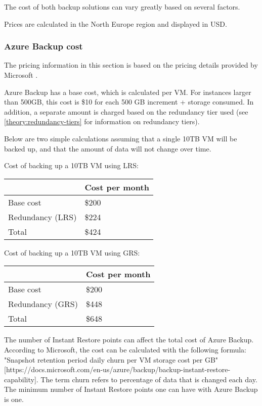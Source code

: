 The cost of both backup solutions can vary greatly based on several factors.

Prices are calculated in the North Europe region and displayed in USD.

\subsubsection{Azure Backup cost}

The pricing information in this section is based on the pricing details provided by Microsoft
\cite{noauthor_pricing_nodate-1}.

Azure Backup has a base cost, which is calculated per VM.
For instances larger than 500GB, this cost is 
\$10 for each 500 GB increment + storage consumed.
In addition, a separate amount is charged based on the redundancy tier used
(see \ref{theory:redundancy-tiers} for information on redundancy tiers).

Below are two simple calculations assuming that a single 10TB VM will be backed up,
and that the amount of data will not change over time.

Cost of backing up a 10TB VM using LRS:
\begin{center}
\begin{tabular}{ll}
\hline
 & Cost per month\\
\hline
Base cost & \$200\\
Redundancy (LRS) & \$224\\
\hline
Total & \$424\\
\hline
\end{tabular}
\end{center}

Cost of backing up a 10TB VM using GRS:
\begin{center}
\begin{tabular}{ll}
\hline
 & Cost per month\\
\hline
Base cost & \$200\\
Redundancy (GRS) & \$448\\
\hline
Total & \$648\\
\hline
\end{tabular}
\end{center}

The number of Instant Restore points can affect the total cost of Azure Backup.
According to Microsoft, the cost can be calculated with the following formula:
"Snapshot retention period daily churn per VM storage cost per GB" 
[https://docs.microsoft.com/en-us/azure/backup/backup-instant-restore-capability].
The term churn refers to percentage of data that is changed each day.
The minimum number of Instant Restore points one can have with Azure Backup is one.

